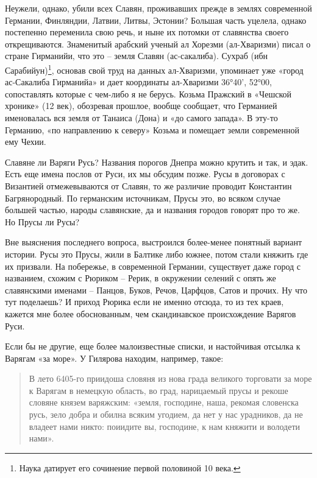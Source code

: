 Неужели, однако, убили всех Славян, проживавших прежде в землях современной Германии, Финляндии, Латвии, Литвы, Эстонии? Большая часть уцелела, однако постепенно переменила свою речь, и ныне их потомки от славянства своего открещиваются. Знаменитый арабский ученый ал Хорезми (ал-Хваризми) писал о стране Гирманийи, что это – земля Славян (ас-сакалиба). Сухраб (ибн Сарабийун)\footnote{Наука датирует его сочинение первой половиной 10 века.}, основав свой труд на данных ал-Хваризми, упоминает уже «город ас-Сакалиба Гирманийа» и дает координаты ал-Хваризми 36°40’, 52°00, сопоставлять которые с чем-либо я не берусь. Козьма Пражский в «Чешской хронике» (12 век), обозревая прошлое, вообще сообщает, что Германией именовалась вся земля от Танаиса (Дона) и «до самого запада». В эту-то Германию, «по направлению к северу» Козьма и помещает земли современной ему Чехии.

Славяне ли Варяги Русь? Названия порогов Днепра можно крутить и так, и эдак. Есть еще имена послов от Руси, их мы обсудим позже. Русы в договорах с Византией отмежевываются от Славян, то же различие проводит Константин Багрянородный. По германским источникам, Прусы это, во всяком случае большей частью, народы славянские, да и названия городов говорят про то же. Но Прусы ли Русы?

Вне выяснения последнего вопроса, выстроился более-менее понятный вариант истории. Русы это Прусы, жили в Балтике либо южнее, потом стали княжить где их призвали. На побережье, в современной Германии, существует даже город с названием, схожим с Рюриком – Рерик, в окружении селений с опять же славянскими именами – Панцов, Буков, Речов, Царфцов, Сатов и прочих. Ну что тут поделаешь? И приход Рюрика если не именно отсюда, то из тех краев, кажется мне более обоснованным, чем скандинавское происхождение Варягов Руси.

Если бы не другие, еще более малоизвестные списки, и настойчивая отсылка к Варягам «за море». У  Гилярова находим, например, такое\cite[стр. 114]{gilyarov01}:

\begin{quotation}
В лето 6405-го приидоша словяня из нова града великого торговати за море к Варягам в немецкую область, во град, нарицаемый прусы и рекоше словяне князем варяжским: «земля, господине, наша, рекомая словенска русь, зело добра и обилна всяким угодием, да нет у нас урадников, да не владеет нами никто: поиидите вы, господине, к нам княжити и володети нами».
\end{quotation}

